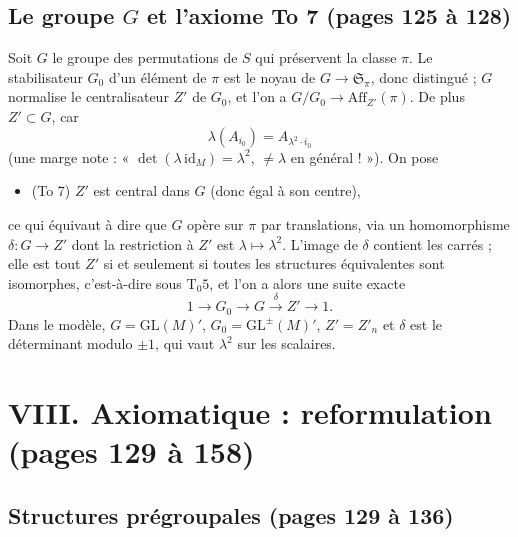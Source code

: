 \documentclass[11pt,a4paper]{article}
\begin{document}
\subsection*{Le groupe $G$ et l'axiome To 7 (pages 125 à 128)}

Soit $G$ le groupe des permutations de $S$ qui préservent la classe $\pi$. Le
stabilisateur $G_0$ d'un élément de $\pi$ est le noyau de $G \to
\mathfrak{S}_\pi$, donc distingué ; $G$ normalise le centralisateur $Z'$ de
$G_0$, et l'on a $G/G_0 \to \mathrm{Aff}_{Z'}(\pi)$. De plus $Z' \subset G$,
car
\[
  \lambda(A_{i_0}) = A_{\lambda^2 \cdot i_0}
\]
(une marge note : « $\det(\lambda\,\mathrm{id}_M) = \lambda^2$, $\neq \lambda$
en général ! »). On pose
\begin{itemize}
  \item (To 7) $Z'$ est central dans $G$ (donc égal à son centre),
\end{itemize}
ce qui équivaut à dire que $G$ opère sur $\pi$ par translations, via un
homomorphisme $\delta : G \to Z'$ dont la restriction à $Z'$ est $\lambda
\mapsto \lambda^2$. L'image de $\delta$ contient les carrés ; elle est tout
$Z'$ si et seulement si toutes les structures équivalentes sont isomorphes,
c'est-à-dire sous $\mathrm{T}_0 5$, et l'on a alors une suite exacte
\[
  1 \longrightarrow G_0 \longrightarrow G \xrightarrow{\ \delta\ } Z'
  \longrightarrow 1 .
\]
Dans le modèle, $G = \mathrm{GL}(M)'$, $G_0 = \mathrm{GL}^{\pm}(M)'$, $Z' =
Z'_n$ et $\delta$ est le déterminant modulo $\pm 1$, qui vaut $\lambda^2$ sur
les scalaires.

\section*{VIII. Axiomatique : reformulation (pages 129 à 158)}

\subsection*{Structures prégroupales (pages 129 à 136)}
\end{document}
